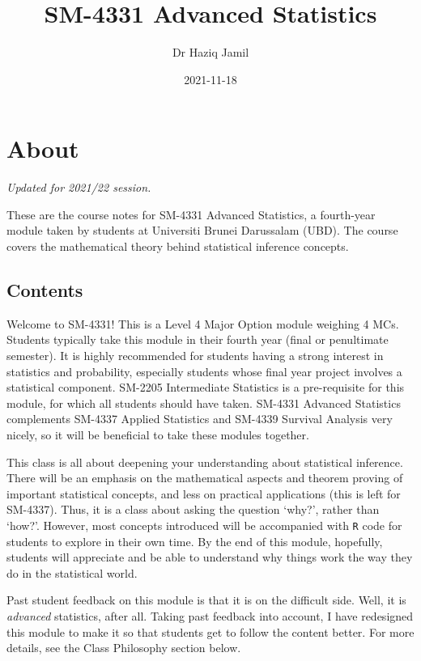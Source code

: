 \documentclass[
]{book}
\title{SM-4331 Advanced Statistics}
\author{Dr Haziq Jamil}
\date{2021-11-18}
\theoremstyle{definition}
\theoremstyle{definition}
\theoremstyle{definition}
\theoremstyle{definition}
\theoremstyle{remark}
\begin{document}
\maketitle

{
\setcounter{tocdepth}{1}
\tableofcontents
}
\hypertarget{about}{%
\chapter*{About}\label{about}}

\emph{Updated for 2021/22 session.}

These are the course notes for SM-4331 Advanced Statistics, a fourth-year module taken by students at Universiti Brunei Darussalam (UBD).
The course covers the mathematical theory behind statistical inference concepts.

\hypertarget{contents}{%
\section*{Contents}\label{contents}}

Welcome to SM-4331!
This is a Level 4 Major Option module weighing 4 MCs.
Students typically take this module in their fourth year (final or penultimate semester).
It is highly recommended for students having a strong interest in statistics and probability, especially students whose final year project involves a statistical component.
SM-2205 Intermediate Statistics is a pre-requisite for this module, for which all students should have taken.
SM-4331 Advanced Statistics complements SM-4337 Applied Statistics and SM-4339 Survival Analysis very nicely, so it will be beneficial to take these modules together.

This class is all about deepening your understanding about statistical inference.
There will be an emphasis on the mathematical aspects and theorem proving of important statistical concepts, and less on practical applications (this is left for SM-4337).
Thus, it is a class about asking the question `why?', rather than `how?'.
However, most concepts introduced will be accompanied with \texttt{R} code for students to explore in their own time.
By the end of this module, hopefully, students will appreciate and be able to understand why things work the way they do in the statistical world.

Past student feedback on this module is that it is on the difficult side.
Well, it is \emph{advanced} statistics, after all.
Taking past feedback into account, I have redesigned this module to make it so that students get to follow the content better.
For more details, see the Class Philosophy section below.
\end{document}
